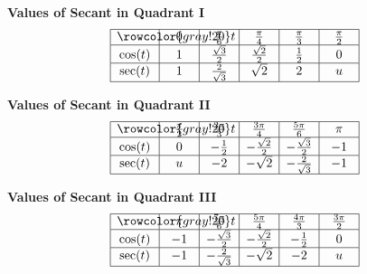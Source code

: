 \documentclass[nooutcomes, noauthor]{ximera}
\begin{document}
\begin{center}
\textbf{Values of Secant in Quadrant I}
\renewcommand*{\arraystretch}{2.5}
\setlength{\arrayrulewidth}{0.5mm}
\setlength{\tabcolsep}{18pt}
\[
\begin{array}{|>{\centering\arraybackslash$} p{1cm} <{$} | >{\centering\arraybackslash$} p{.75cm} <{$} |  >{\centering\arraybackslash$} p{.75cm} <{$} |  >{\centering\arraybackslash$} p{.75cm} <{$} |  >{\centering\arraybackslash$} p{.75cm} <{$} |  >{\centering\arraybackslash$} p{.75cm} <{$} |}
\hline 
\rowcolor{gray!20}
t & 0 & \frac{\pi}{6} & \frac{\pi}{4} & \frac{\pi}{3} & \frac{\pi}{2}\\
\hline
\cos(t) & 1 & \frac{\sqrt{3}}{2} & \frac{\sqrt{2}}{2} & \frac{1}{2} & 0\\
\hline
\sec(t) & 1 & \frac{2}{\sqrt{3}}& \sqrt{2} & 2 & u\\
\hline 
\end{array}
\]
\end{center}

\begin{center}
\textbf{Values of Secant in Quadrant II}
\renewcommand*{\arraystretch}{2.5}
\setlength{\arrayrulewidth}{0.5mm}
\setlength{\tabcolsep}{18pt}
\[
\begin{array}{|>{\centering\arraybackslash$} p{1cm} <{$} | >{\centering\arraybackslash$} p{.75cm} <{$} |  >{\centering\arraybackslash$} p{.75cm} <{$} |  >{\centering\arraybackslash$} p{.75cm} <{$} |  >{\centering\arraybackslash$} p{.75cm} <{$} |  >{\centering\arraybackslash$} p{.75cm} <{$} |}
\hline 
\rowcolor{gray!20}
t & \frac{\pi}{2} & \frac{2\pi}{3} & \frac{3\pi}{4} & \frac{5\pi}{6} & \pi\\
\hline
\cos(t) & 0 & -\frac{1}{2} &-\frac{\sqrt{2}}{2} & -\frac{\sqrt{3}}{2} & -1\\
\hline
\sec(t) & u & -2& -\sqrt{2} & -\frac{2}{\sqrt{3}}& -1\\
\hline 
\end{array}
\]
\end{center}

\begin{center}
\textbf{Values of Secant in Quadrant III}
\renewcommand*{\arraystretch}{2.5}
\setlength{\arrayrulewidth}{0.5mm}
\setlength{\tabcolsep}{18pt}
\[
\begin{array}{|>{\centering\arraybackslash$} p{1cm} <{$} | >{\centering\arraybackslash$} p{.75cm} <{$} |  >{\centering\arraybackslash$} p{.75cm} <{$} |  >{\centering\arraybackslash$} p{.75cm} <{$} |  >{\centering\arraybackslash$} p{.75cm} <{$} |  >{\centering\arraybackslash$} p{.75cm} <{$} |}
\hline 
\rowcolor{gray!20}
t & \pi & \frac{7\pi}{6} & \frac{5\pi}{4} & \frac{4\pi}{3} & \frac{3\pi}{2}\\
\hline
\cos(t) & -1 & -\frac{\sqrt{3}}{2} & -\frac{\sqrt{2}}{2} & -\frac{1}{2} & 0\\
\hline
\sec(t) & -1 & -\frac{2}{\sqrt{3}}& -\sqrt{2} & -2 & u\\
\hline 
\end{array}
\]
\end{center}
\end{document}

